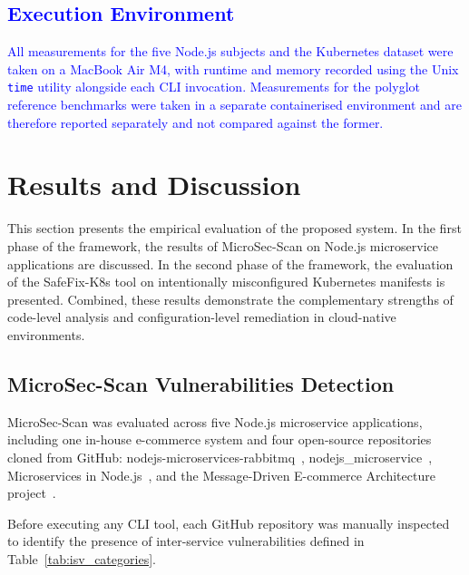 \documentclass[preprint,12pt]{elsarticle}
\newcommand{\new}[1]{\textcolor{blue}{#1}}
\begin{document}
\new{\subsection{Execution Environment}}

\new{All measurements for the five Node.js subjects and the Kubernetes
dataset were taken on a MacBook Air M4, with runtime and memory recorded
using the Unix \texttt{time} utility alongside each CLI invocation.
Measurements for the polyglot reference benchmarks were taken in a separate
containerised environment and are therefore reported separately and not
compared against the former.}



\section{Results and Discussion}

This section presents the empirical evaluation of the proposed system.
In the first phase of the framework, the results of MicroSec-Scan on Node.js microservice applications are discussed.
In the second phase of the framework, the evaluation of the SafeFix-K8s tool on intentionally misconfigured Kubernetes manifests is presented. Combined, these results demonstrate the complementary strengths of code-level analysis and configuration-level remediation in cloud-native environments.

\subsection{MicroSec-Scan Vulnerabilities Detection}

MicroSec-Scan was evaluated across five Node.js microservice applications, including one in-house e-commerce system and four open-source repositories cloned from GitHub: nodejs-microservices-rabbitmq~\cite{petrea_nodejs_rabbitmq},
\newline
nodejs\_microservice~\cite{codergogoi_nodejs_microservice}, Microservices in Node.js~\cite{tiwari_microservices_nodejs}, and the Message-Driven E-commerce Architecture project~\cite{ondiek_message_driven_ecommerce}.

Before executing any CLI tool, each GitHub repository was manually inspected to identify the presence of inter-service vulnerabilities defined in Table~\ref{tab:isv_categories}.
\end{document}
